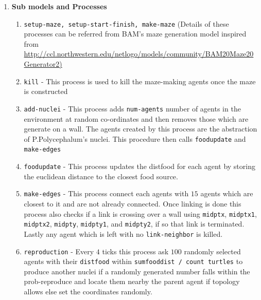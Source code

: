 \documentclass[a4paper, 12pt]{article}
\begin{document}
\begin{enumerate}
    \item \textbf{Sub models and Processes}
    \begin{enumerate}
        \item \texttt{setup-maze, setup-start-finish, make-maze} (Details of these processes can be referred from BAM's maze generation model inspired from \url{http://ccl.northwestern.edu/netlogo/models/community/BAM20Maze20Generator2)}
        \item \texttt{kill} - This process is used to kill the maze-making agents once the maze is constructed
        \item \texttt{add-nuclei} - This process adds \texttt{num-agents} number of agents in the environment at random co-ordinates and then removes those which are generate on a wall. The agents created by this process are the abstraction of P.Polycephalum's nuclei. This procedure then calls \texttt{foodupdate} and \texttt{make-edges}
        \item \texttt{foodupdate} - This process updates the distfood for each agent by storing the euclidean distance to the closest food source.
        \item \texttt{make-edges} - This process connect each agents with $15$ agents which are closest to it and are not already connected. Once linking is done this process also checks if a link is crossing over a wall using \texttt{midptx}, \texttt{midptx1}, \texttt{midptx2}, \texttt{midpty}, \texttt{midpty1}, and \texttt{midpty2}, if so that link is terminated. Lastly any agent which is left with no \texttt{link-neighbor} is killed.
        \item \texttt{reproduction} - Every $4$ ticks this process ask $100$ randomly selected agents with their \texttt{distfood} within \texttt{sumfooddist / count turtles} to produce another nuclei if a randomly generated number falls within the prob-reproduce and locate them nearby the parent agent if topology allows else set the coordinates randomly.
        \end{enumerate}
    \end{enumerate}
    \newpage
\end{document}
